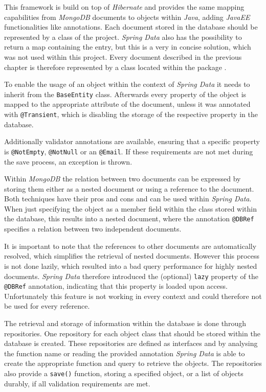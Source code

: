 This framework is build on top of \emph{Hibernate} and provides the same mapping capabilities from \emph{MongoDB} documents to objects within \emph{Java}, adding \emph{JavaEE} functionalities like annotations. Each document stored in the database should be represented by a class of the project. \emph{Spring Data} also has the possibility to return a map containing the entry, but this is a very in concise solution, which was not used within this project. Every document described in the previous chapter is therefore represented by a class located within the package . 

To enable the usage of an object within the context of \emph{Spring Data} it needs to inherit from the \texttt{BaseEntity} class. Afterwards every property of the object is mapped to the appropriate attribute of the document, unless it was annotated with \texttt{@Transient}, which is disabling the storage of the respective property in the database. 

Additionally validator annotations are available, ensuring that a specific property is \texttt{@NotEmpty}, \texttt{@NotNull} or an \texttt{@Email}. If these requirements are not met during the save process, an exception is thrown. 

Within \emph{MongoDB} the relation between two documents can be expressed by storing them either as a nested document or using a reference to the document. Both techniques have their pros and cons and can be used within \emph{Spring Data}. When just specifying the object as a member field within the class stored within the database, this results into a nested document, where the annotation \texttt{@DBRef} specifies a relation between two independent documents.

It is important to note that the references to other documents are automatically resolved, which simplifies the retrieval of nested documents. However this process is not done lazily, which resulted into a bad query performance for highly nested documents. \emph{Spring Data} therefore introduced the (optional) \texttt{lazy} property of the \texttt{@DBRef} annotation, indicating that this property is loaded upon access. Unfortunately this feature is not working in every context and could therefore not be used for every reference.

The retrieval and storage of information within the database is done through repositories. One repository for each object class that should be stored within the database is created. These repositories are defined as interfaces and by analysing the function name or reading the provided annotation \emph{Spring Data} is able to create the appropriate function and query to retrieve the objects. The repositories also provide a \texttt{save()} function, storing a specified object, or a list of objects durably, if all validation requirements are met. 

